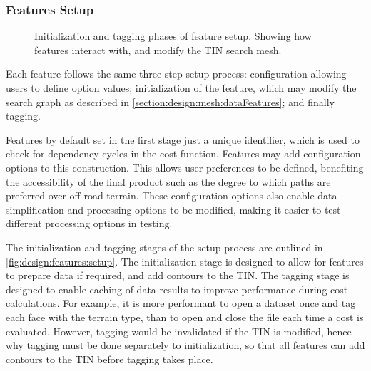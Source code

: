 \documentclass[12pt]{article}
\begin{document}
\subsubsection{Features Setup}

\begin{figure}[H]
  \centering
  \caption{Initialization and tagging phases of feature setup. Showing how features interact with, and modify the TIN search mesh.}
  \label{fig:design:features:setup}
\end{figure}

Each feature follows the same three-step setup process: configuration allowing users to define option values; initialization of the feature, which may modify the search graph as described in \autoref{section:design:mesh:dataFeatures}; and finally tagging.

Features by default set in the first stage just a unique identifier, which is used to check for dependency cycles in the cost function. Features may add configuration options to this construction. This allows user-preferences to be defined, benefiting the accessibility of the final product such as the degree to which paths are preferred over off-road terrain. These configuration options also enable data simplification and processing options to be modified, making it easier to test different processing options in testing.

The initialization and tagging stages of the setup process are outlined in \autoref{fig:design:features:setup}. The initialization stage is designed to allow for features to prepare data if required, and add contours to the TIN. The tagging stage is designed to enable caching of data results to improve performance during cost-calculations. For example, it is more performant to open a dataset once and tag each face with the terrain type, than to open and close the file each time a cost is evaluated. However, tagging would be invalidated if the TIN is modified, hence why tagging must be done separately to initialization, so that all features can add contours to the TIN before tagging takes place.
\end{document}
